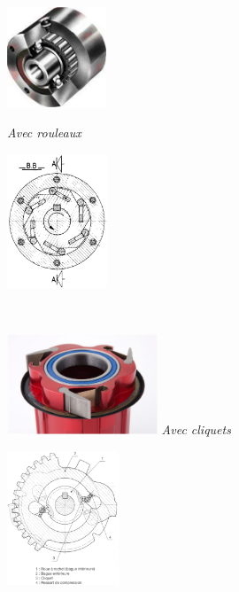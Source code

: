\documentclass[11pt,oneside]{article}
\begin{document}
\begin{minipage}[c]{.2\linewidth}
\begin{center}
\includegraphics[height=3cm]{png/fig_19}

\textit{Avec rouleaux}
\end{center}
\end{minipage} \hfill
\begin{minipage}[c]{.2\linewidth}
\begin{center}
\includegraphics[height=4cm]{png/fig_20}

\textit{$\quad$}
\end{center}
\end{minipage} \hfill
\begin{minipage}[c]{.2\linewidth}
\begin{center}
\includegraphics[height=3cm]{png/fig_21}
\textit{Avec cliquets}
\end{center}
\end{minipage} \hfill
\begin{minipage}[c]{.2\linewidth}
\begin{center}
\includegraphics[height=4cm]{png/fig_22}

\textit{$\quad$}
\end{center}
\end{minipage} 
\end{document}
